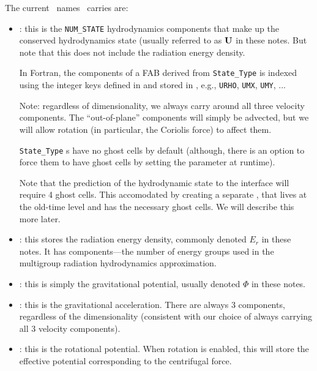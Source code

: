 The current \statedata\ names  \castro\ carries are:
\begin{itemize}
\item {} : this is the {\tt NUM\_STATE} hydrodynamics
  components that make up the conserved hydrodynamics state (usually
  referred to as ${\bf U}$ in these notes.  But note that this does
  not include the radiation energy density.

  In Fortran, the components of a FAB derived from {\tt State\_Type}
  is indexed using the integer keys defined in 
  and stored in , e.g., {\tt URHO}, {\tt UMX},
  {\tt UMY}, ...

  Note: regardless of dimensionality, we always carry around all
  three velocity components.  The ``out-of-plane'' components
  will simply be advected, but we will allow rotation (in particular,
  the Coriolis force) to affect them.

  {\tt State\_Type} \multifab s have no ghost cells by default
  (although, there is an option to force them to have ghost cells by
  setting the parameter  at runtime).

  Note that the prediction of the hydrodynamic state to the interface
  will require 4 ghost cells.  This accomodated by creating a separate
  \multifab,  that lives at the old-time level and
  has the necessary ghost cells.  We will describe this more later.

\item {} : this stores the radiation energy density,
  commonly denoted $E_r$ in these notes.  It has 
  components---the number of energy groups used in the multigroup
  radiation hydrodynamics approximation. 

\item {} : this is simply the gravitational
  potential, usually denoted $\Phi$ in these notes.

\item {} : this is the gravitational
  acceleration. There are always 3 components, regardless of the
  dimensionality (consistent with our choice of always carrying all 3
  velocity components).

\item {} : this is the rotational potential.
  When rotation is enabled, this will store the effective potential
  corresponding to the centrifugal force. 


\end{itemize}
